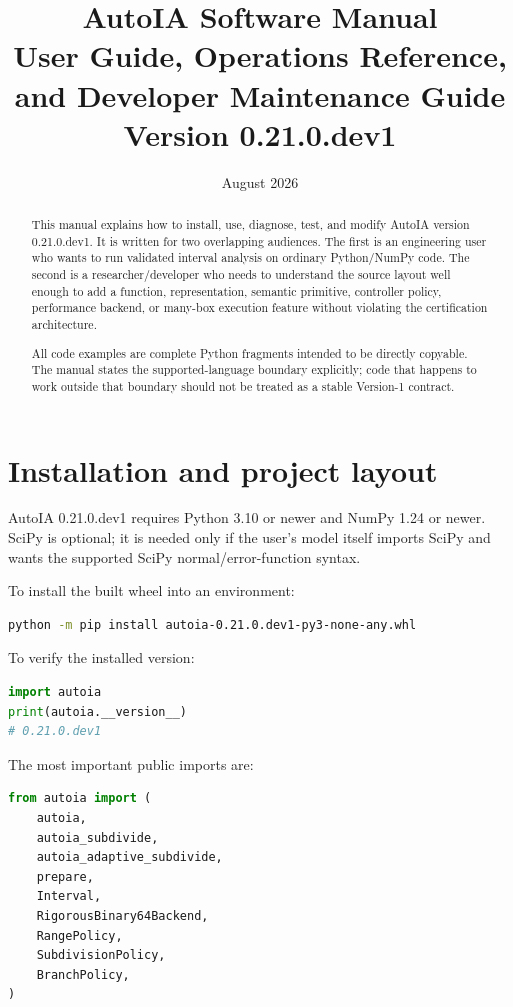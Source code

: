 \documentclass[11pt]{article}
\title{\textbf{AutoIA Software Manual}\\
User Guide, Operations Reference, and Developer Maintenance Guide\\
Version 0.21.0.dev1}
\author{}
\date{August 2026}
\begin{document}
\maketitle

\begin{abstract}
This manual explains how to install, use, diagnose, test, and modify AutoIA
version 0.21.0.dev1.  It is written for two overlapping audiences.  The first is
an engineering user who wants to run validated interval analysis on ordinary
Python/NumPy code.  The second is a researcher/developer who needs to understand
the source layout well enough to add a function, representation, semantic
primitive, controller policy, performance backend, or many-box execution feature
without violating the certification architecture.

All code examples are complete Python fragments intended to be directly
copyable.  The manual states the supported-language boundary explicitly; code
that happens to work outside that boundary should not be treated as a stable
Version-1 contract.
\end{abstract}

\tableofcontents
\newpage

\section{Installation and project layout}

AutoIA 0.21.0.dev1 requires Python 3.10 or newer and NumPy 1.24 or newer.  SciPy
is optional; it is needed only if the user's model itself imports SciPy and wants
the supported SciPy normal/error-function syntax.

To install the built wheel into an environment:
\begin{lstlisting}[language=bash]
python -m pip install autoia-0.21.0.dev1-py3-none-any.whl
\end{lstlisting}

To verify the installed version:
\begin{lstlisting}[language=Python]
import autoia
print(autoia.__version__)
# 0.21.0.dev1
\end{lstlisting}

The most important public imports are:
\begin{lstlisting}[language=Python]
from autoia import (
    autoia,
    autoia_subdivide,
    autoia_adaptive_subdivide,
    prepare,
    Interval,
    RigorousBinary64Backend,
    RangePolicy,
    SubdivisionPolicy,
    BranchPolicy,
)
\end{lstlisting}
\end{document}
